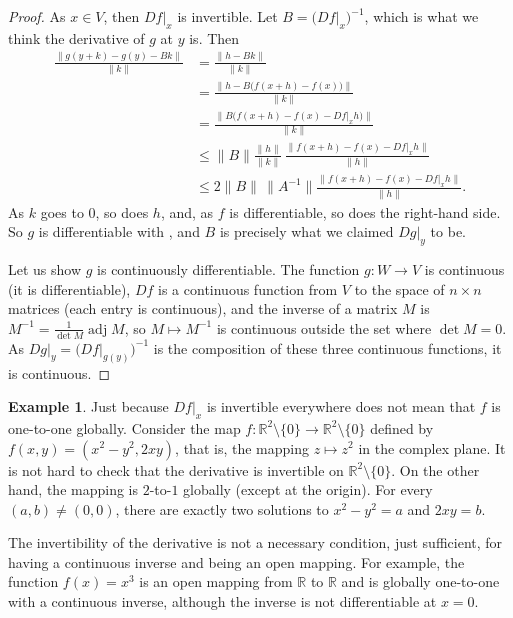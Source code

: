 \documentclass[12pt,openany]{book}
\newcommand{\snorm}[1]{\lVert {#1} \rVert}
\newcommand{\R}{{\mathbb{R}}}
\theoremstyle{plain}
\theoremstyle{remark}
\theoremstyle{definition}
\theoremstyle{exercise}
\theoremstyle{example}
\newtheorem{example}[thm]{Example}
\begin{document}
\begin{proof}
As $x \in V$, then $Df|_x$ is invertible.
Let $B = \bigl(Df|_x\bigr)^{-1}$, which is what we think the derivative of
$g$ at $y$ is.  Then
\begin{equation*}
\begin{split}
\frac{\snorm{g(y+k)-g(y)-Bk}}{\snorm{k}}
& =
\frac{\snorm{h-Bk}}{\snorm{k}}
\\
& =
\frac{\snorm{h-B\bigl(f(x+h)-f(x)\bigr)}}{\snorm{k}}
\\
& =
\frac{\snorm{B\bigl(f(x+h)-f(x)-Df|_x h\bigr)}}{\snorm{k}}
\\
& \leq
\snorm{B}
\frac{\snorm{h}}{\snorm{k}}\,
\frac{\snorm{f(x+h)-f(x)-Df|_x h}}{\snorm{h}}
\\
& \leq
2\snorm{B} \, \snorm{A^{-1}}
\frac{\snorm{f(x+h)-f(x)-Df|_x h}}{\snorm{h}} .
\end{split}
\end{equation*}
As $k$ goes to $0$, so does $h$, and, as $f$ is differentiable, so does the right-hand side.
So $g$ is differentiable with , and $B$
is precisely what we claimed $Dg|_y$ to be.

Let us show $g$ is continuously
differentiable.
The function $g \colon W \to V$ is continuous (it is differentiable),
$Df$ is a continuous function from $V$
to the space of $n \times n$ matrices (each entry is continuous),
and the inverse of a matrix $M$ is $M^{-1} = \frac{1}{\det M} \operatorname{adj} M$,
so $M \mapsto M^{-1}$ is continuous outside the set where $\det M = 0$.
As
$Dg|_y = {\bigl( Df|_{g(y)}\bigr)}^{-1}$ is the composition
of these three
continuous functions, it is continuous.
\end{proof}

\begin{example}
Just because $Df|_x$ is invertible everywhere does not
mean that $f$ is
one-to-one globally.  Consider
the map $f \colon \R^2 \setminus \{ 0 \} \to \R^2 \setminus \{
0 \}$ defined
by $f(x,y) = (x^2-y^2,2xy)$,  that is, the mapping $z \mapsto z^2$ in the
complex plane.  It is not hard to check that
the derivative is invertible on $\R^2 \setminus \{ 0 \}$.
On the other hand, the mapping is $2$-to-$1$ globally (except at the origin).
For every $(a,b) \not= (0,0)$, there are exactly two
solutions to $x^2-y^2=a$ and $2xy=b$.
\end{example}

The invertibility of the derivative is not a necessary
condition, just sufficient, for having a continuous inverse and being an open
mapping.  For example, the function $f(x) = x^3$ is an open mapping from $\R$
to $\R$ and is globally one-to-one with a continuous inverse, although the
inverse is not differentiable at $x=0$.
\end{document}
